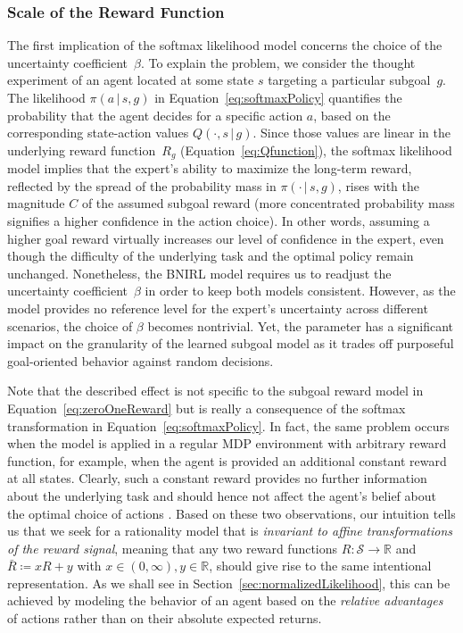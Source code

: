 \documentclass[twoside,11pt]{article}
\newcommand{\given}{\,\vert\,}
\newcommand{\softmax}{{\pi}}
\newcommand{\defeq}{\coloneqq}
\begin{document}
\subsubsection{Scale of the Reward Function}
\label{sec:choiceOfBeta}
The first implication of the softmax likelihood model %
concerns the choice of the uncertainty coefficient~$\beta$.  To explain the problem, we consider the thought experiment of an agent located at some state $s$ targeting a particular subgoal~$g$. The likelihood $\softmax(a \given s, g)$ in Equation~\eqref{eq:softmaxPolicy} quantifies the probability that the agent decides for a specific action $a$, based on the corresponding state-action values $Q(\cdot, s \given g)$. Since %
those values are linear in the underlying reward function~$R_g$ (Equation~\ref{eq:Qfunction}), %
the softmax likelihood model %
implies that the expert's %
ability to maximize the long-term reward, reflected by the %
spread of the probability mass in $\softmax(\cdot \given s, g)$, rises with the magnitude $C$ of the assumed subgoal reward (more concentrated probability mass signifies a higher confidence in the action choice). In other words, assuming a higher goal reward virtually increases our level of confidence in the expert, even though the difficulty of the underlying task and the optimal %
policy remain unchanged. Nonetheless, the BNIRL model requires us to readjust the uncertainty coefficient~$\beta$ %
in order to keep both models %
consistent. %
However, as the model provides no %
reference level for the expert's uncertainty across different scenarios, the choice of $\beta$ becomes nontrivial. Yet, the parameter has a significant impact on the granularity of the learned subgoal model as it trades off purposeful goal-oriented behavior against random decisions.

Note that the described effect is not specific to the subgoal reward model in Equation~\eqref{eq:zeroOneReward} but is really a consequence of the softmax transformation in Equation~\eqref{eq:softmaxPolicy}. In fact, the same problem occurs when the model is applied in a regular MDP environment with arbitrary reward function, for example, when the agent is provided an additional constant reward at all states. Clearly, such a %
constant reward provides no further information about the underlying task and should hence not affect the agent's belief about the optimal choice of actions \citep[compare discussion on constant reward functions and transformations of rewards,][]{ng2000algorithms,ng1999policy}. %
%
Based on these two observations, our intuition tells us that %
we %
seek for a rationality model that is \textit{invariant to affine transformations of the reward signal}, meaning that any two reward functions $R:\mathcal{S}\rightarrow\mathbb{R}$ and $\bar{R}\defeq xR+y$ with $x\in(0,\infty),y\in\mathbb{R}$, should %
give rise to the same intentional representation.
%
%
%
%
%
As we shall see in Section~\ref{sec:normalizedLikelihood}, %
this can be achieved by modeling the behavior of %
an agent %
based on the \textit{relative advantages} of actions rather than on their absolute expected returns. %
%
\end{document}
